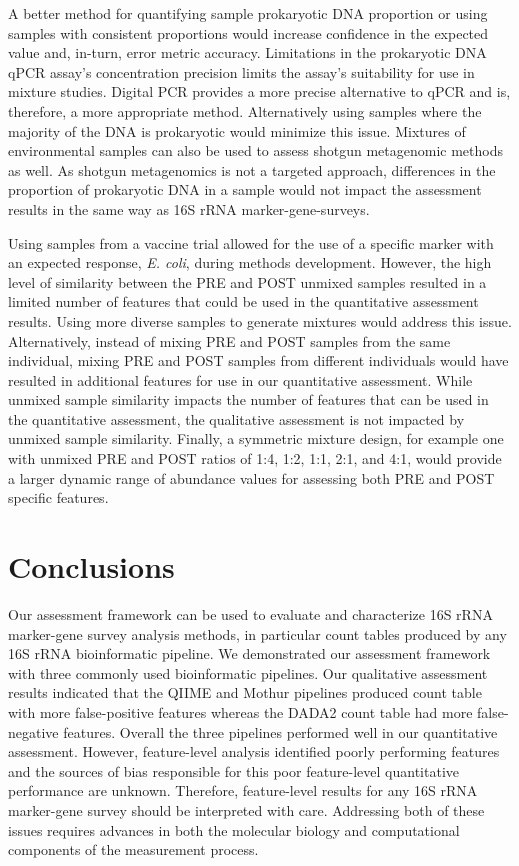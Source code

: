 \documentclass{bmcart}
\begin{document}
A better method for quantifying sample prokaryotic DNA proportion or
using samples with consistent proportions would increase confidence in
the expected value and, in-turn, error metric accuracy. Limitations in the
prokaryotic DNA qPCR assay's concentration precision limits the
assay's suitability for use in mixture studies. Digital PCR provides a
more precise alternative to qPCR and is, therefore, a more appropriate
method. Alternatively using samples where the majority of the DNA is
prokaryotic would minimize this issue. Mixtures of environmental samples
can also be used to assess shotgun metagenomic methods as well. As
shotgun metagenomics is not a targeted approach, differences in the
proportion of prokaryotic DNA in a sample would not impact the
assessment results in the same way as 16S rRNA marker-gene-surveys.

Using samples from a vaccine trial allowed for the use of a specific
marker with an expected response, \emph{E. coli}, during methods
development. However, the high level of similarity between the PRE and POST unmixed
samples resulted in a limited number of features that could be used in
the quantitative assessment results. Using more diverse samples to
generate mixtures would address this issue.
Alternatively, instead of mixing PRE and POST samples from the same individual,
mixing PRE and POST samples from different individuals would
have resulted in additional features for use in our quantitative assessment.
While unmixed sample similarity impacts the number of features
that can be used in the quantitative assessment, the qualitative
assessment is not impacted by unmixed sample similarity.
Finally, a symmetric mixture design, for example one with unmixed
PRE and POST ratios of 1:4, 1:2, 1:1, 2:1, and 4:1, would provide a larger
dynamic range of abundance values for assessing both PRE and POST specific features.


\section*{Conclusions}
Our assessment framework can be used to evaluate and characterize 16S rRNA marker-gene survey analysis methods, in particular count tables produced by any 16S rRNA bioinformatic pipeline.
We demonstrated our assessment framework with three commonly used bioinformatic pipelines.
Our qualitative assessment results indicated that the QIIME and Mothur pipelines produced count table with more false-positive features whereas the DADA2 count table had more false-negative features.
Overall the three pipelines performed well in our quantitative assessment. 
However, feature-level analysis identified poorly performing features and the sources of  
bias responsible for this poor feature-level quantitative performance are unknown. 
Therefore, feature-level results for any 16S rRNA marker-gene survey should be interpreted with care. 
Addressing both of these issues requires advances in both the molecular biology and
computational components of the measurement process.
\end{document}
